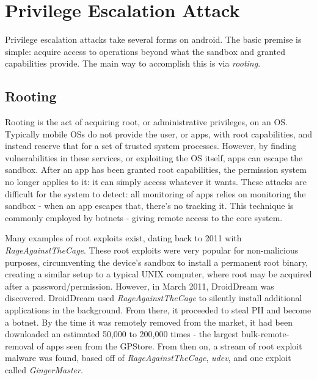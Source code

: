 \section{Privilege Escalation Attack}
Privilege escalation attacks take several forms on android. The basic premise is simple: acquire access to operations beyond what the sandbox and granted capabilities provide. The main way to accomplish this is via \textit{rooting}.

\subsection{Rooting}
Rooting is the act of acquiring root, or administrative privileges, on an OS. Typically mobile OSs do not provide the user, or apps, with root capabilities, and instead reserve that for a set of trusted system processes. However, by finding vulnerabilities in these services, or exploiting the OS itself, apps can escape the sandbox. After an app has been granted root capabilities, the permission system no longer applies to it: it can simply access whatever it wants. These attacks are difficult for the system to detect: all monitoring of apps relies on monitoring the sandbox - when an app escapes that, there's no tracking it. This technique is commonly employed by botnets - giving remote access to the core system. 

Many examples of root exploits exist, dating back to 2011 with \textit{RageAgainstTheCage}\citep{droiddream}. These root exploits were very popular for non-malicious purposes, circumventing the device's sandbox to install a permanent root binary, creating a similar setup to a typical UNIX computer, where root may be acquired after a password/permission. However, in March 2011, DroidDream was discovered. DroidDream used \textit{RageAgainstTheCage} to silently install additional applications in the background. From there, it proceeded to steal PII and become a botnet. By the time it was remotely removed from the market, it had been downloaded an estimated 50,000 to 200,000 times\citep{castillo2010android} - the largest bulk-remote-removal of apps seen from the GPStore. From then on, a stream of root exploit malware was found, based off of \textit{RageAgainstTheCage}, \textit{udev}, and one exploit called \textit{GingerMaster}\citep{gingermaster}.

